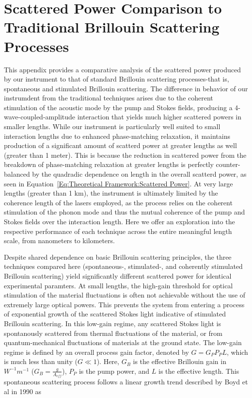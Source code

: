 \newpage


\section{Scattered Power Comparison to Traditional Brillouin Scattering Processes}
\label{appendix:comparison}

This appendix provides a comparative analysis of the scattered power produced by our instrument to that of standard Brillouin scattering processes-that is, spontaneous and stimulated Brillouin scattering. The difference in behavior of our instrumdent from the traditional techniques arises due to the coherent stimulation of the acoustic mode by the pump and Stokes fields, producing a 4-wave-coupled-amplitude interaction that yields much higher scattered powers in smaller lengths. While our instrument is particularly well suited to small interaction lengths due to enhanced phase-matching relaxation, it maintains production of a significant amount of scatterd power at greater lengths as well (greater than 1 meter). This is because the reduction in scattered power from the breakdown of phase-matching relaxation at greater lengths is perfectly counter-balanced by the quadradic dependence on length in the overall scatterd power, as seen in Equation~\ref{Eq:Theoretical Framework:Scattered Power}. At very large lengths (greater than 1 km), the instrument is ultimately limited by the coherence length of the lasers employed, as the process relies on the coherent stimulation of the phonon mode and thus the mutual coherence of the pump and Stokes fields over the interaction length. Here we offer an exploration into the respective performance of each technique across the entire meaningful length scale, from nanometers to kilometers.

Despite shared dependence on basic Brillouin scattering principles, the three techniques compared here (spontaneous-, stimulated-, and coherently stimulated Brillouin scattering) yield significantly different scattered power for identical experimental paramters. At small lengths, the high-gain threshold for optical stimulation of the material fluctuations is often not achievable without the use of extremely large optical powers. This prevents the system from entering a process of exponential growth of the scattered Stokes light indicative of stimulated Brillouin scattering.\cite{boyd2020nonlinear} In this low-gain regime, any scattered Stokes light is spontanously scattered from thermal fluctuations of the material, or from quantum-mechanical fluctuations of materials at the ground state. The low-gain regime is defined by an overall process gain factor, denoted by $G = G_{P}P_{P}L$, which is much less than unity ($G \ll 1$). Here, $G_{B}$ is the effective Brillouin gain in $W^{-1}m^{-1}$ ($G_{B} = \frac{g}{A_{eff}}$), $P_{P}$ is the pump power, and $L$ is the effective length. This spontaneous scattering process follows a linear growth trend described by Boyd et al in 1990\cite{boyd1990noise} as

